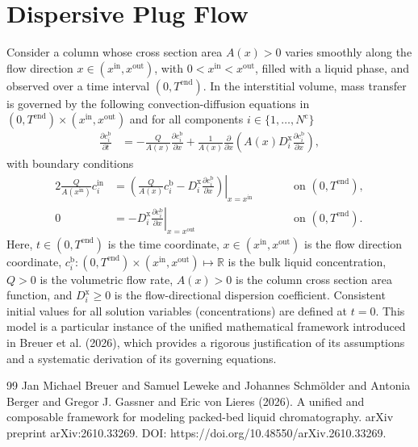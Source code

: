 \documentclass{article}
\begin{document}
\section*{Dispersive Plug Flow}
Consider a column whose cross section area $A(x) > 0$ varies smoothly along the flow direction $x \in (x^{\mathrm{in}}, x^{\mathrm{out}})$, with $0 < x^{\mathrm{in}} < x^{\mathrm{out}}$, filled with a liquid phase, and observed over a time interval $(0, T^{\mathrm{end}})$.
In the interstitial volume, mass transfer is governed by the following convection-diffusion equations in $(0, T^{\mathrm{end}})\times (x^{\mathrm{in}}, x^{\mathrm{out}})$ and for all components $i\in\{1, \dots, N^{\mathrm{c}} \}$
\begin{align}
    \frac{\partial c^{\mathrm{b}}_{i}}{\partial t}
    &= - \frac{Q}{A(x)} \frac{\partial c^{\mathrm{b}}_{i}}{\partial x}
        + \frac{1}{A(x)} \frac{\partial}{\partial x} \left( A(x) D^{\mathrm{x}}_{i} \frac{\partial c^{\mathrm{b}}_{i}}{\partial x} \right),
\end{align}
with boundary conditions
\begin{alignat}{2}
    \frac{Q}{A(x^{\mathrm{in}})} c^{\mathrm{in}}_{i}
    &= \left.\left( \frac{Q}{A(x)} c^{\mathrm{b}}_{i} - D^{\mathrm{x}}_{i} \frac{\partial c^{\mathrm{b}}_{i}}{\partial x}\right)\right|_{x=x^{\mathrm{in}}}
    & & \qquad\text{on }(0, T^{\mathrm{end}}),
    \\
    0
    &= - D^{\mathrm{x}}_{i} \left. \frac{\partial c^{\mathrm{b}}_{i}}{\partial x} \right|_{x=x^{\mathrm{out}}}
    & & \qquad\text{on }(0, T^{\mathrm{end}}).
\end{alignat}
Here, $t\in (0, T^{\mathrm{end}})$ is the time coordinate, $x\in (x^{\mathrm{in}}, x^{\mathrm{out}})$ is the flow direction coordinate, $c^{\mathrm{b}}_{i}\colon (0, T^{\mathrm{end}})\times (x^{\mathrm{in}}, x^{\mathrm{out}}) \mapsto \mathbb{R}$ is the bulk liquid concentration, $Q> 0$ is the volumetric flow rate, $A(x) > 0$ is the column cross section area function, and $D^{\mathrm{x}}_{i}\geq 0$ is the flow-directional dispersion coefficient.
Consistent initial values for all solution variables (concentrations) are defined at $t = 0$.
This model is a particular instance of the unified mathematical framework introduced in Breuer et al. (2026), which provides a rigorous justification of its assumptions and a systematic derivation of its governing equations.
\begin{thebibliography}{99}
     Jan Michael Breuer and Samuel Leweke and Johannes Schmölder and Antonia Berger and Gregor J. Gassner and Eric von Lieres (2026). A unified and composable framework for modeling packed-bed liquid chromatography. arXiv preprint arXiv:2610.33269. DOI: https://doi.org/10.48550/arXiv.2610.33269.
\end{thebibliography}
\end{document}
